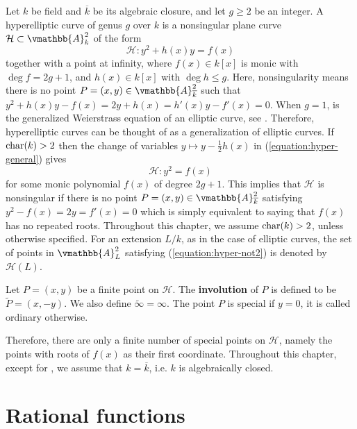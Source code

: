 Let $k$ be field and $\overline{k}$ be its algebraic closure, and let $g \ge 2$ be an integer. A 
hyperelliptic curve of genus $g$ over $k$ is a nonsingular plane curve $\mathcal{H} \subset 
\vmathbb{A}_{k}^2$ of the form
\begin{equation}
\label{equation:hyper-general}
\mathcal{H}: y^2 + h(x)y = f(x)
\end{equation}
together with a point at infinity, where $f(x) \in k[x]$ is monic with $\deg f = 2g + 1$, and $h(x) 
\in k[x]$ with $\deg h \le g$. Here, nonsingularity means there is no point $P = (x, y) \in 
\vmathbb{A}_{\overline{k}}^2$ such that $y^2 + h(x)y - f(x) = 2y + h(x) = h'(x)y - f'(x) = 0$. When 
$g = 1$,  is the generalized Weierstrass equation of an elliptic 
curve, see . Therefore, hyperelliptic curves can be thought of as a 
generalization of elliptic curves. If $\operatorname{char}(k) > 2$ then the change of variables $y \mapsto y 
- \frac{1}{2}h(x)$ in (\ref{equation:hyper-general}) gives
\begin{equation}
\label{equation:hyper-not2}
\mathcal{H}: y^2 = f(x)
\end{equation}
for some monic polynomial $f(x)$ of degree $2g + 1$. This implies that $\mathcal{H}$ is nonsingular 
if there is no point $P = (x, y) \in \vmathbb{A}_{\overline{k}}^2$ satisfying $y^2 - f(x) = 2y = 
f'(x) = 0$ which is simply equivalent to saying that $f(x)$ has no repeated roots. Throughout this 
chapter, we assume $\operatorname{char}(k) > 2$, unless otherwise specified. For an extension $L / k$, as in 
the case of elliptic curves, the set of points in $\vmathbb{A}_L^2$ satisfying 
(\ref{equation:hyper-not2}) is denoted by $\mathcal{H}(L)$.
\begin{definition}
Let $P = (x, y)$ be a finite point on $\mathcal{H}$. The \textbf{involution} of $P$ is defined to be 
$\tilde{P} = (x, -y)$. We also define $\tilde{\infty} = \infty$. The point $P$  is special if $y = 
0$, it is called ordinary otherwise.
\end{definition}
Therefore, there are only a finite number of special points on $\mathcal{H}$, namely the points with 
roots of $f(x)$ as their first coordinate. Throughout this chapter, except for 
, we assume that $k = \overline{k}$, i.e. $k$ is algebraically closed.








\section{Rational functions}
\label{section:rational-functions}

